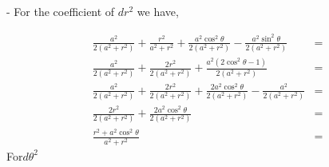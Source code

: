 - For the coefficient of $d r^2$ we have,


\begin{align}
    \frac{a^2}{2\left(a^2+r^2\right)}+\frac{r^2}{a^2+r^2}+\frac{a^2 \cos ^2 \theta}{2\left(a^2+r^2\right)}-\frac{a^2 \sin ^2 \theta}{2\left(a^2+r^2\right)}    & = \\
    \frac{a^2}{2\left(a^2+r^2\right)}+\frac{2 r^2}{2\left(a^2+r^2\right)}+\frac{a^2\left(2 \cos ^2 \theta-1\right)}{2\left(a^2+r^2\right)}                     & = \\
    \frac{a^2}{2\left(a^2+r^2\right)}+\frac{2 r^2}{2\left(a^2+r^2\right)}+\frac{2 a^2 \cos ^2 \theta}{2\left(a^2+r^2\right)}-\frac{a^2}{2\left(a^2+r^2\right)} & = \\
    \frac{2 r^2}{2\left(a^2+r^2\right)}+\frac{2 a^2 \cos ^2 \theta}{2\left(a^2+r^2\right)}                                                                     & = \\
    \frac{r^2+a^2 \cos ^2 \theta}{a^2+r^2}                                                                                                                     & =
\end{align}
For$ d \theta^2$

